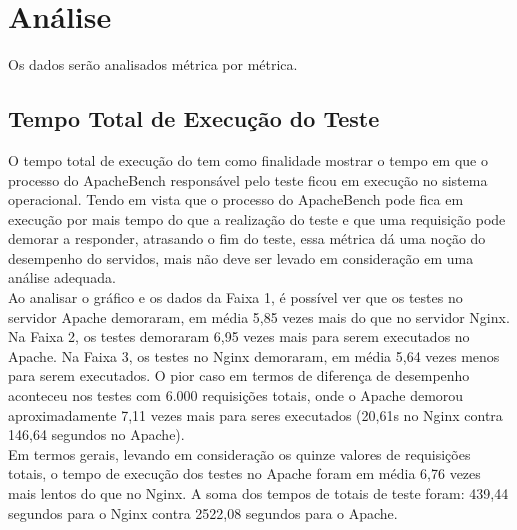 \section{Análise}\label{sec:analise-dos-dados}
Os dados serão analisados métrica por métrica.
\subsection{Tempo Total de Execução do Teste}
O tempo total de execução do tem como finalidade mostrar o tempo em que o 
processo do ApacheBench responsável pelo teste ficou em execução no sistema 
operacional. Tendo em vista que o processo do ApacheBench pode fica em execução 
por mais tempo do que a realização do teste e que uma requisição pode demorar a 
responder, atrasando o fim do teste, essa métrica dá uma noção do desempenho do 
servidos, mais não deve ser levado em consideração em uma análise adequada.\\
Ao analisar o gráfico e os dados da Faixa 1, é possível ver que os testes no 
servidor Apache demoraram, em média 5,85 vezes mais do que no servidor Nginx. 
Na Faixa 2, os testes demoraram 6,95 vezes mais para serem executados no 
Apache. Na Faixa 3, os testes no Nginx demoraram, em média 5,64 vezes menos 
para serem executados. O pior caso em termos de diferença de desempenho 
aconteceu nos testes com 6.000 requisições totais, onde o Apache demorou 
aproximadamente 7,11 vezes mais para seres executados (20,61s no Nginx contra 
146,64 segundos no Apache).\\
Em termos gerais, levando em consideração os quinze valores de requisições 
totais, o tempo de execução dos testes no Apache foram em média 6,76 vezes mais 
lentos do que no Nginx. A soma dos tempos de totais de teste foram: 439,44 
segundos para o Nginx contra 2522,08 segundos para o Apache.